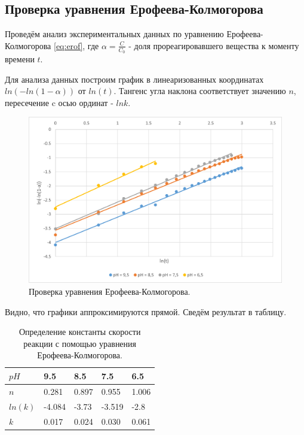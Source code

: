 \documentclass[a4paper,12pt]{article} %
\begin{document}
\subsection{Проверка уравнения Ерофеева-Колмогорова}

Проведём анализ экспериментальных данных по уравнению Ерофеева-Колмогорова \eqref{eq:erof}, где  $\alpha = \frac{C}{C_0}$ - доля прореагировавшего вещества к моменту времени $t$.

Для анализа данных построим график в линеаризованных координатах $ln(-ln(1-\alpha))$ от $ln(t)$. Тангенс угла наклона соответствует значению $n$, пересечение c осью ординат - $lnk$.

\begin{figure}[H]
    \centering
    \includegraphics[scale=1]{Рисунок6.png}
    \caption{Проверка уравнения Ерофеева-Колмогорова.
}
    \label{pic:6}
\end{figure}

Видно, что графики аппроксимируются прямой. Сведём результат в таблицу.

\begin{table}[H]
    \centering
    \begin{tabular}{|l|l|l|l|l|}
    \hline
        $pH$ & 9.5 & 8.5 & 7.5 & 6.5 \\ \hline
        $n$ & 0.281 & 0.897 & 0.955 & 1.006 \\ \hline
        $ln(k)$ & -4.084 & -3.73 & -3.519 & -2.8 \\ \hline
        $k$ & 0.017 & 0.024 & 0.030 & 0.061 \\ \hline
    \end{tabular}
     \caption{Определение константы скорости реакции с помощью уравнения Ерофеева-Колмогорова.}
    \label{tab:6}
\end{table}
\end{document}
